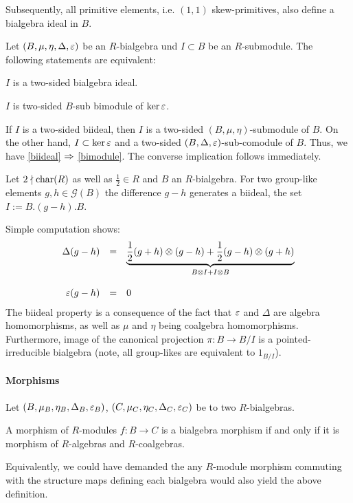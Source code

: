 \indent Subsequently, all primitive elements, i.e. $(1,1)$ skew-primitives, also define a bialgebra ideal in $B$.
\begin{lemm}
Let $(B,\mu,\eta,\Delta,\eps)$ be an $R$-bialgebra und $I \subset B$ be an $R$-submodule. The following statements are equivalent:
\bn
\item\label{biideal} $I$ is a two-sided bialgebra ideal.
\item\label{bimodule} $I$ is two-sided $B$-sub bimodule of $\ker \eps$.
\en
\end{lemm}
\bws If $I$ is a two-sided biideal, then $I$ is a two-sided $(B,\mu,\eta)$-submodule of $B$. On the other hand, $I \subset \ker \eps$ and a two-sided $(B,\Delta,\eps)$-sub-comodule of $B$. Thus, we have \ref{biideal} $\RA$ \ref{bimodule}. The converse implication follows immediately.
\begin{lemm}\label{GroupLikeHopfIdeal}
Let $2 \nmid \trm{char}(R)$ as well as $\frac{1}{2} \in R$ and $B$ an $R$-bialgebra. For two group-like elements $g,h \in \mathcal{G}(B)$ the difference $g - h$ generates a biideal, the set $I := B.(g - h).B$.
\end{lemm}
\bws Simple computation shows:
$$\bao{rcl}
\Delta(g - h) &=& \underbrace{\frac{1}{2}(g + h) \otimes (g - h) + \frac{1}{2}(g - h) \otimes (g + h)}_{B \otimes I + I \otimes B}\\
&&\\
\eps(g - h) &=& 0\\
\ea$$
The biideal property is a consequence of the fact that $\eps$ and $\Delta$ are algebra homomorphisms, as well as $\mu$ and $\eta$ being coalgebra homomorphisms. Furthermore, image of the canonical projection $\pi : B \longrightarrow B/I$ is a pointed-irreducible bialgebra (note, all group-likes are equivalent to $1_{B/I}$).
\paragraph{Morphisms}
Let $(B,\mu_B,\eta_B,\Delta_B,\eps_B)$, $(C,\mu_C,\eta_C,\Delta_C,\eps_C)$ be to two $R$-bialgebras.
\begin{defi}
A morphism of $R$-modules $f: B \longrightarrow C$ is a bialgebra morphism if and only if it is morphism of $R$-algebras and $R$-coalgebras.
\end{defi}
Equivalently, we could have demanded the any $R$-module morphism commuting with the structure maps defining each bialgebra would also yield the above definition.
